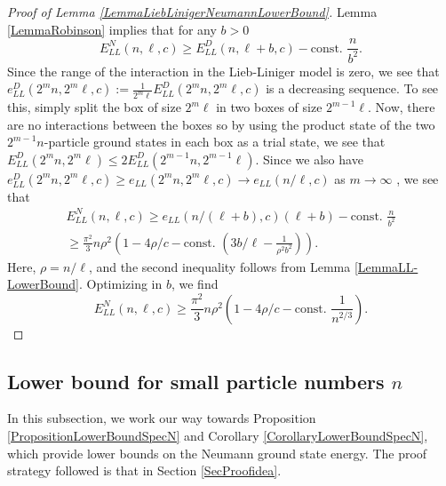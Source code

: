 \documentclass[a4paper,11pt]{article}
\numberwithin{equation}{section}
\begin{document}
	\begin{proof}[Proof of Lemma \ref{LemmaLiebLinigerNeumannLowerBound}]
		Lemma \ref{LemmaRobinson} implies that for any $ b>0 $ \begin{equation}
			E_{LL}^{N}(n,\ell,c)\geq E_{LL}^D(n,\ell+b,c)-\text{const. }\frac{n}{b^2}.
		\end{equation}
		Since the range of the interaction in the Lieb-Liniger model is zero, we see that $ e^D_{LL}(2^mn,2^m\ell,c):=\frac{1}{2^m\ell}E_{LL}^{D}(2^mn,2^m\ell,c) $ is a decreasing sequence. To see this, simply split the box of size $ 2^m\ell $ in two boxes of size $ 2^{m-1}\ell $. Now, there are no interactions between the boxes so by using the product state of the two $ 2^{m-1}n $-particle ground states in each box as a trial state, we see that $ E^D_{LL}(2^{m}n,2^m\ell)\leq 2E^D_{LL}(2^{m-1}n,2^{m-1}\ell)  $. Since we also have $ e^D_{LL}(2^mn,2^m\ell,c)\geq e_{LL}(2^mn,2^m\ell,c)\to e_{LL}(n/\ell,c) $ as $ m\to\infty $ \cite{lieb1963exact}, we see that \begin{equation}
			\begin{aligned}
				E_{LL}^{N}(n,\ell,c)\geq e_{LL}(n/(\ell+b),c)(\ell+b)-\text{const. }\frac{n}{b^2}\\\geq \frac{\pi^2}{3}n\rho^2\left(1-4\rho/c-\text{const. }\left(3b/\ell-\frac{1}{\rho^2b^2}\right)\right).
			\end{aligned}
		\end{equation}
		Here, $ \rho=n/\ell $, and the second inequality follows from Lemma \ref{LemmaLL-LowerBound}. Optimizing in $ b $, we find \begin{equation}
			E_{LL}^{N}(n,\ell,c)\geq \frac{\pi^2}{3}n\rho^2\left(1-4\rho/c-\text{const. }\frac{1}{n^{2/3}}\right).
		\end{equation}
	\end{proof}
	\subsection{Lower bound for small particle numbers $n$}
	\label{seclowsmalln}
	In this subsection, we work our way towards Proposition \ref{PropositionLowerBoundSpecN} and Corollary \ref{CorollaryLowerBoundSpecN}, which provide lower bounds on the Neumann ground state energy. The proof strategy followed is that in Section \ref{SecProofidea}.
	
\end{document}
